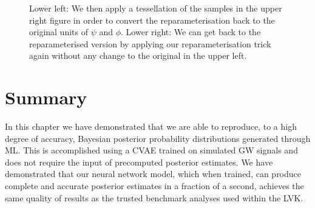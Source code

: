 \begin{figure}
{    Lower left: We then apply a tessellation of the samples in the 
    upper right figure in order to convert the reparameterisation back 
    to the original units of $\psi$ and $\phi$. Lower right: We can 
    get back to the reparameterised version by applying our 
    reparameterisation trick again without any change to the original 
    in the upper left.~}
    \label{fig:Xpsi}
\end{figure}

%
%
%
\section{Summary}

In this chapter we have demonstrated that we are able to reproduce, to a high degree 
of accuracy, Bayesian posterior probability distributions generated through \ac{ML}. 
This is accomplished using a \ac{CVAE} trained on simulated \ac{GW} signals and does not 
require the input of precomputed posterior estimates. We have demonstrated that our 
neural network model, which
when trained, can produce complete and accurate posterior estimates in a fraction of a second, achieves the same quality of results as the trusted benchmark analyses used within the \ac{LVK}.

